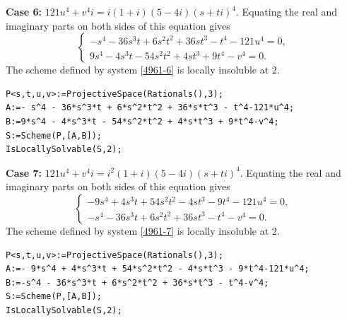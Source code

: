 \documentclass[a4paper,12pt,english,reqno]{amsart}
\begin{document}
{\bf Case 6:} $121u^4+v^4i=i(1+i)(5- 4i)(s+ti)^4$.  Equating the real and imaginary parts on both sides of this equation gives
\begin{equation}\label{4961-6}
\begin{cases}
-s^4 - 36s^3t + 6s^2t^2 + 36st^3 - t^4 - 121u^4=0,\\
9s^4 - 4s^3t - 54s^2t^2 + 4st^3 + 9t^4 - v^4=0.
\end{cases}
\end{equation}
The scheme defined by system \eqref{4961-6} is locally insoluble at $2$.

\begin{lstlisting}
P<s,t,u,v>:=ProjectiveSpace(Rationals(),3);
A:=- s^4 - 36*s^3*t + 6*s^2*t^2 + 36*s*t^3 - t^4-121*u^4;
B:=9*s^4 - 4*s^3*t - 54*s^2*t^2 + 4*s*t^3 + 9*t^4-v^4;
S:=Scheme(P,[A,B]);
IsLocallySolvable(S,2);
\end{lstlisting}


{\bf Case 7:} $121u^4+v^4i=i^2(1+i)(5- 4i)(s+ti)^4$.  Equating the real and imaginary parts on both sides of this equation gives
\begin{equation}\label{4961-7}
\begin{cases}
-9s^4 + 4s^3t + 54s^2t^2 - 4st^3 - 9t^4 - 121u^4=0,\\
-s^4 - 36s^3t + 6s^2t^2 + 36st^3 - t^4 - v^4=0.
\end{cases}
\end{equation}
The scheme defined by system \eqref{4961-7} is locally insoluble at $2$.

\begin{lstlisting}
P<s,t,u,v>:=ProjectiveSpace(Rationals(),3);
A:=- 9*s^4 + 4*s^3*t + 54*s^2*t^2 - 4*s*t^3 - 9*t^4-121*u^4;
B:=-s^4 - 36*s^3*t + 6*s^2*t^2 + 36*s*t^3 - t^4-v^4;
S:=Scheme(P,[A,B]);
IsLocallySolvable(S,2);
\end{lstlisting}
\end{document}
